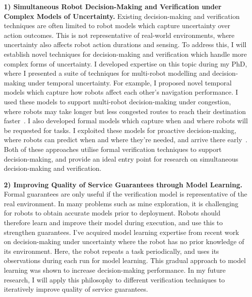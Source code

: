 \documentclass[12pt]{article}
\begin{document}
\vspace*{1ex}\noindent\textbf{1) Simultaneous Robot Decision-Making and Verification under Complex Models of Uncertainty.} 
%
Existing decision-making and verification techniques are often limited to robot models which capture uncertainty over action outcomes.
%
This is not representative of real-world environments, where uncertainty also affects robot action durations and sensing.
%
To address this, I will establish novel techniques for decision-making and verification which handle more complex forms of uncertainty.
%
I developed expertise on this topic during my PhD, where I presented a suite of techniques for multi-robot modelling and decision-making under temporal uncertainty.
%
For example, I proposed novel temporal models which capture how robots affect each other's navigation performance.
%
I used these models to support multi-robot decision-making under congestion, where robots may take longer but less congested routes to reach their destination faster~\cite{street2020multi,street2021congestion}.
%
I also developed formal models which capture when and where robots will be requested for tasks.
%
I exploited these models for proactive decision-making, where robots can predict when and where they're needed, and arrive there early~\cite{street2024right}.
%
Both of these approaches utilise formal verification techniques to support decision-making, and provide an ideal entry point for research on simultaneous decision-making and verification.

\vspace*{1ex}\noindent\textbf{2) Improving Quality of Service Guarantees through Model Learning.}
%
Formal guarantees are only useful if the verification model is representative of the real environment.
%
In many problems such as mine exploration, it is challenging for robots to obtain accurate models prior to deployment.
%
Robots should therefore learn and improve their model during execution, and use this to strengthen guarantees.
%
I've acquired model learning expertise from recent work on decision-making under uncertainty where the robot has no prior knowledge of its environment.
%
Here, the robot repeats a task periodically, and uses its observations during each run for model learning.
%
This gradual approach to model learning was shown to increase decision-making performance.
%
In my future research, I will apply this philosophy to different verification techniques to iteratively improve quality of service guarantees.
\end{document}
